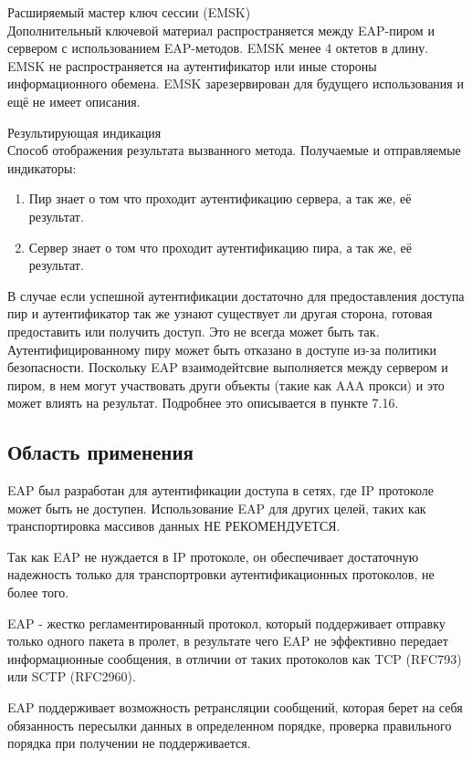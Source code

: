 Расширяемый мастер ключ сессии (EMSK) \\ Дополнительный ключевой материал распространяется между EAP-пиром и сервером с использованием EAP-методов. EMSK менее 4 октетов в длину. EMSK не распространяется на аутентификатор или иные стороны информационного обемена. EMSK зарезервирован для будущего использования и ещё не имеет описания.

Результирующая индикация \\ Способ отображения результата вызванного метода. Получаемые и отправляемые индикаторы:

\begin{enumerate}
\item Пир знает о том что проходит аутентификацию сервера, а так же, её результат.
\item Сервер знает о том что проходит аутентификацию пира, а так же, её результат.
\end{enumerate}

В случае если успешной аутентификации достаточно для предоставления доступа пир и аутентификатор так же узнают существует ли другая сторона, готовая предоставить или получить доступ. Это не всегда может быть так. Аутентифицированному пиру может быть отказано в доступе из-за политики безопасности. Поскольку EAP взаимодейтсвие выполняется между сервером и пиром, в нем могут участвовать други объекты (такие как AAA прокси) и это может влиять на результат. Подробнее это описывается в пункте 7.16.

\subsection{Область применения}

EAP был разработан для аутентификации доступа в сетях, где IP протоколе может быть не доступен. Использование EAP для других целей, таких как транспортировка массивов данных НЕ РЕКОМЕНДУЕТСЯ.

Так как EAP не нуждается в IP протоколе, он обеспечивает достаточную надежность только для транспортровки аутентификационных протоколов, не более того.

EAP - жестко регламентированный протокол, который поддерживает отправку только одного пакета в пролет, в результате чего EAP не эффективно передает информационные сообщения, в отличии от таких протоколов как TCP (RFC793) или SCTP (RFC2960).

EAP поддерживает возможность ретрансляции сообщений, которая берет на себя обязанность пересылки данных в определенном порядке, проверка правильного порядка при получении не поддерживается.

